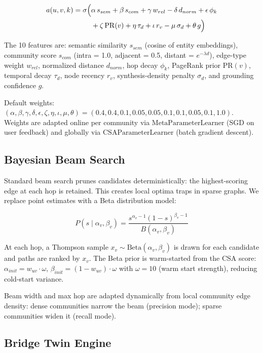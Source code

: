 \documentclass[10pt,twocolumn]{article}
\begin{document}
\begin{align}
a(u,v,k) = \sigma\Bigl(
  &\alpha\,s_{sem}  + \beta\,s_{com}  + \gamma\,w_{rel}
   - \delta\,d_{norm} + \epsilon\,\phi_k \nonumber\\
  &+ \zeta\,\mathrm{PR}(v) + \eta\,\tau_d + \iota\,r_v
   - \mu\,\sigma_d  + \theta\,g \Bigr)
\label{eq:csa}
\end{align}

The 10 features are: semantic similarity $s_{sem}$ (cosine of entity embeddings),
community score $s_{com}$ (intra = 1.0, adjacent = 0.5, distant = $e^{-\lambda d}$),
edge-type weight $w_{rel}$, normalized distance $d_{norm}$, hop decay $\phi_k$,
PageRank prior $\mathrm{PR}(v)$, temporal decay $\tau_d$, node recency $r_v$,
synthesis-density penalty $\sigma_d$, and grounding confidence $g$.

Default weights: $(\alpha,\beta,\gamma,\delta,\epsilon,\zeta,\eta,\iota,\mu,\theta) =
(0.4,0.4,0.1,0.05,0.05,0.1,0.1,0.05,0.1,1.0)$.
Weights are adapted online per community via $\mathrm{MetaParameterLearner}$ (SGD on
user feedback) and globally via $\mathrm{CSAParameterLearner}$ (batch gradient descent).

\subsection{Bayesian Beam Search}
\label{sec:beam}

Standard beam search prunes candidates deterministically: the highest-scoring edge at
each hop is retained. This creates local optima traps in sparse graphs. We replace point
estimates with a Beta distribution model:

\begin{equation}
P(s \mid \alpha_v, \beta_v) = \frac{s^{\alpha_v - 1}(1-s)^{\beta_v - 1}}{B(\alpha_v,\beta_v)}
\label{eq:beta}
\end{equation}

At each hop, a Thompson sample $x_v \sim \mathrm{Beta}(\alpha_v, \beta_v)$ is drawn for
each candidate and paths are ranked by $x_v$. The Beta prior is warm-started from the
CSA score: $\alpha_{init} = w_{uv}\cdot\omega$, $\beta_{init} = (1-w_{uv})\cdot\omega$
with $\omega = 10$ (warm start strength), reducing cold-start variance.

Beam width and max hop are adapted dynamically from local community edge density: dense
communities narrow the beam (precision mode); sparse communities widen it (recall mode).

\subsection{Bridge Twin Engine}
\label{sec:bridge}
\end{document}
